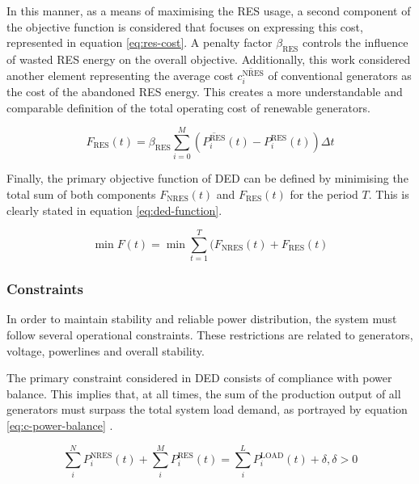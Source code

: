 In this manner, as a means of maximising the \ac{RES} usage, a second component of the objective function is considered that focuses on expressing this cost, represented in equation \ref{eq:res-cost}. A penalty factor $\beta_\text{RES}$ controls the influence of wasted \ac{RES} energy on the overall objective. Additionally, this work considered another element representing the average cost $\overline{c^\text{NRES}_i}$ of conventional generators as the cost of the abandoned \ac{RES} energy. This creates a more understandable and comparable definition of the total operating cost of renewable generators.  \par

\begin{equation} \label{eq:res-cost}
	F_\text{RES}(t) = \beta_\text{RES} \sum^M_{i=0}  (\overline{P^\text{RES}_i}(t) - P^\text{RES}_i(t)) \Delta t 
\end{equation}

Finally, the primary objective function of \ac{DED} can be defined by minimising the total sum of both components $F_\text{NRES}(t)$ and $F_\text{RES}(t)$ for the period $T$. This is clearly stated in equation \ref{eq:ded-function}.

\begin{equation} \label{eq:ded-function}
	\min F (t) =  \min\sum^T_{t=1}(F_\text{NRES}(t) + F_{\text{RES}}(t)
\end{equation}

\subsubsection{Constraints} \label{sec:constraints}

In order to maintain stability and reliable power distribution, the system must follow several operational constraints. These restrictions are related to generators, voltage, powerlines and overall stability.  \par

The primary constraint considered in \ac{DED} consists of compliance with power balance. This implies that, at all times, the sum of the production output of all generators must surpass the total system load demand, as portrayed by equation \ref{eq:c-power-balance} \cite{}. 

\begin{equation} \label{eq:c-power-balance}
	\sum^N_i P^\text{NRES}_i(t) + \sum^M_i P^\text{RES}_i(t) = \sum^L_i P^\text{LOAD}_i(t) + \delta, \delta > 0
\end{equation}


